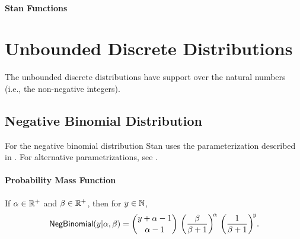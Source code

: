 

\subsubsection{Stan Functions}

\begin{description}
%
\end{description}



\chapter{Unbounded Discrete Distributions}

\noindent
The unbounded discrete distributions have support over the natural
numbers (i.e., the non-negative integers).


\section{Negative Binomial Distribution}

For the negative binomial distribution Stan uses the parameterization
described in \citet{GelmanEtAl:2013}.  For alternative parametrizations, see .

\subsubsection{Probability Mass Function}

If $\alpha \in \posreals$ and $\beta \in \posreals$, then for $y \in
\nats$,
\[
\distro{NegBinomial}(y|\alpha,\beta)
 =
\binom{y + \alpha - 1}{\alpha - 1}
\,
\left( \frac{\beta}{\beta+1} \right)^{\!\alpha}
\,
\left( \frac{1}{\beta + 1} \right)^{\!y} \!.
\]


